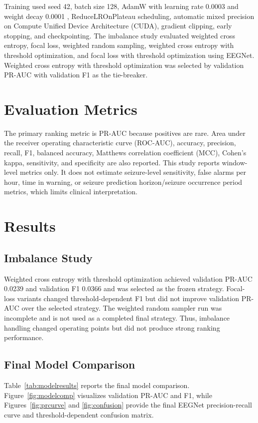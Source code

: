 \documentclass[10pt,conference]{IEEEtran}
\begin{document}
Training used seed 42, batch size 128, AdamW with learning rate 0.0003 and weight decay 0.0001 \cite{loshchilov2019decoupled}, ReduceLROnPlateau scheduling, automatic mixed precision on Compute Unified Device Architecture (CUDA), gradient clipping, early stopping, and checkpointing. The imbalance study evaluated weighted cross entropy, focal loss, weighted random sampling, weighted cross entropy with threshold optimization, and focal loss with threshold optimization using EEGNet. Weighted cross entropy with threshold optimization was selected by validation PR-AUC with validation F1 as the tie-breaker.

\section{Evaluation Metrics}
The primary ranking metric is PR-AUC because positives are rare. Area under the receiver operating characteristic curve (ROC-AUC), accuracy, precision, recall, F1, balanced accuracy, Matthews correlation coefficient (MCC), Cohen's kappa, sensitivity, and specificity are also reported. This study reports window-level metrics only. It does not estimate seizure-level sensitivity, false alarms per hour, time in warning, or seizure prediction horizon/seizure occurrence period metrics, which limits clinical interpretation.

\section{Results}
\subsection{Imbalance Study}
Weighted cross entropy with threshold optimization achieved validation PR-AUC 0.0239 and validation F1 0.0366 and was selected as the frozen strategy. Focal-loss variants changed threshold-dependent F1 but did not improve validation PR-AUC over the selected strategy. The weighted random sampler run was incomplete and is not used as a completed final strategy. Thus, imbalance handling changed operating points but did not produce strong ranking performance.

\subsection{Final Model Comparison}
Table~\ref{tab:modelresults} reports the final model comparison. Figure~\ref{fig:modelcomp} visualizes validation PR-AUC and F1, while Figures~\ref{fig:prcurve} and \ref{fig:confusion} provide the final EEGNet precision-recall curve and threshold-dependent confusion matrix.
\end{document}
